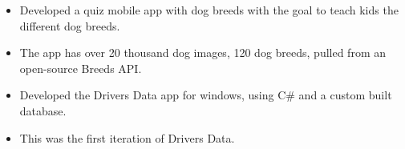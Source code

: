 \documentclass[10pt,a4paper,ragged2e]{resume}
\begin{document}
\begin{fullwidth}
        \newpage


        \begin{itemize}
            \item Developed a quiz mobile app with dog breeds with the goal to teach kids the different dog breeds.
            \item The app has over 20 thousand dog images, 120 dog breeds, pulled from an open-source Breeds API.
            \smallskip
        \end{itemize}
        \divider

        \begin{itemize}
            \item Developed the Drivers Data app for windows, using C\# and a custom built database.
            \item This was the first iteration of Drivers Data.
            \smallskip
        \end{itemize}
    \end{fullwidth}


    \clearpage\nocite{*}
\end{document}
